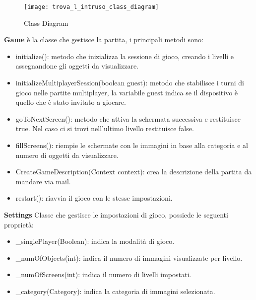 \begin{figure}
	\centering
	\texttt{[image: trova\_l\_intruso\_class\_diagram]}
	\caption{Class Diagram}
	\label{fig:class_diagram}
\end{figure}
\begin{description}
\item \textbf{Game} \`{e} la classe che gestisce la partita, i principali metodi sono:
\begin{itemize}
\item initialize(): metodo che inizializza la sessione di gioco, creando i livelli e assegnandone gli oggetti da visualizzare.
\item initializeMultiplayerSession(boolean guest): metodo che stabilisce i turni di gioco nelle partite multiplayer, la variabile guest indica se il dispositivo \`{e} quello che \`{e} stato invitato a giocare.
\item goToNextScreen(): metodo che attiva la schermata successiva e restituisce true. Nel caso ci si trovi nell'ultimo livello restituisce false.
\item fillScreens(): riempie le schermate con le immagini in base alla categoria e al numero di oggetti da visualizzare.
\item CreateGameDescription(Context context): crea la descrizione della partita da mandare via mail.
\item restart(): riavvia il gioco con le stesse impostazioni.
\end{itemize}
\item \textbf{Settings} Classe che gestisce le impostazioni di gioco, possiede le seguenti propriet\`{a}:
\begin{itemize}
\item \_singlePlayer(Boolean): indica la modalit\`{a} di gioco.
\item \_numOfObjects(int): indica il numero di immagini visualizzate per livello.
\item \_numOfScreens(int): indica il numero di livelli impostati.
\item \_category(Category): indica la categoria di immagini selezionata.
\end{itemize}


\end{description}
